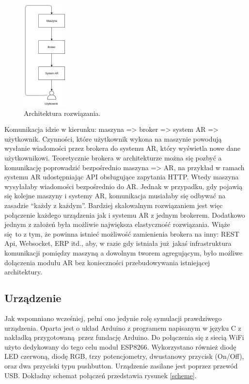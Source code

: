 \documentclass[12pt,twoside,polish]{article}
\begin{document}
\begin{figure}[h]
	\centering	
	\includegraphics[width=0.2\textwidth]{architektura}
	\caption{Architektura rozwiązania.}
	\label{arch}
\end{figure}

Komunikacja idzie w kierunku: maszyna => broker => system AR => użytkownik. Czynności, które użytkownik wykona na maszynie powodują wysłanie wiadomości przez brokera do systemu AR, który wyświetla nowe dane użytkownikowi. Teoretycznie brokera w architekturze można się pozbyć a komunikację poprowadzić bezpośrednio maszyna => AR, na przykład w ramach systemu AR udostępniając API obsługujące zapytania HTTP. Wtedy maszyna wysyłałaby wiadomości bezpośrednio do AR. Jednak w przypadku, gdy pojawią się kolejne maszyny i systemy AR, komunikacja musiałaby się odbywać na zasadzie \enquote{każdy z każdym}. Bardziej skalowalnym rozwiązaniem jest więc połączenie każdego urządzenia jak i systemu AR z jednym brokerem. Dodatkowo jednym z założeń była możliwie największa elastyczność rozwiązania. Wiąże się to z tym, że powinna istnieć możliwość zamienienia brokera na inny: REST Api, Websocket, ERP itd., aby, w razie gdy istniała już jakaś infrastruktura komunikacji pomiędzy maszyną a dowolnym tworem agregującym, było możliwe dołączenia modułu AR bez konieczności przebudowywania istniejącej architektury.

\subsection{Urządzenie}
Jak wspomniano wcześniej, pełni ono jedynie rolę symulacji prawdziwego urządzenia. Oparta jest o układ Arduino z programem napisanym w języku C z nakładką przygotowaną przez fundację Arduino. Do połączenia się z siecią WiFi użyto dedykowany do tego celu moduł ESP8266. Wykorzystano również diodę LED czerwoną, diodę RGB, trzy potencjometry, dwustanowy przycisk (On/Off), oraz dwa przyciski typu pushbutton. Urządzenie zasilane jest poprzez przewód USB. Dokładny schemat połączeń przedstawia rysunek \ref{scheme}.
\end{document}
